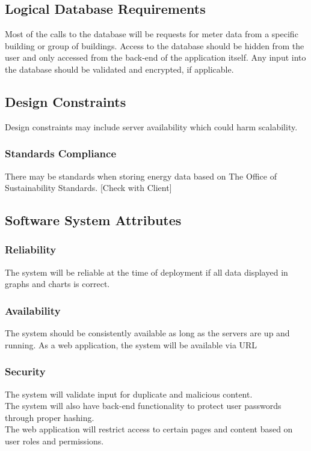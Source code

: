 \documentclass[onecolumn, draftclsnofoot,10pt, compsoc]{IEEEtran}
\begin{document}
    \subsection{Logical Database Requirements}
    Most of the calls to the database will be requests for meter data from a specific building or group of buildings. Access to the database should be hidden from the user and only accessed from the back-end of the application itself. Any input into the database should be validated and encrypted, if applicable. 
    
    \subsection{Design Constraints}
    Design constraints may include server availability which could harm scalability.
    \subsubsection{Standards Compliance}
    There may be standards when storing energy data based on The Office of Sustainability Standards.
    [Check with Client]

    \subsection{Software System Attributes}
    
    \subsubsection{Reliability}
    The system will be reliable at the time of deployment if all data displayed in graphs and charts is correct.\\
    \subsubsection{Availability}
    The system should be consistently available as long as the servers are up and running. As a web application, the system will be available via URL 
    \subsubsection{Security}
    The system will validate input for duplicate and malicious content.\\
    The system will also have back-end functionality to protect user passwords through proper hashing.\\
    The web application will restrict access to certain pages and content based on user roles and permissions.
\end{document}
